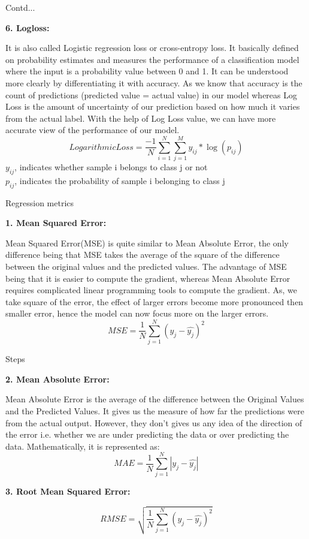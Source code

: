 \documentclass{beamer}
\newcommand\myheading[1]{%
  \par\bigskip
  {\large\bfseries#1}\par\smallskip}
\begin{document}
\begin{frame}{Contd...}
	\begin{flushleft}
	\myheading{6. Logloss:}
	It is also called Logistic regression loss or cross-entropy loss. It basically defined on probability estimates and measures the performance of a classification model where the input is a probability value between 0 and 1. It can be understood more clearly by differentiating it with accuracy. As we know that accuracy is the count of predictions (predicted value = actual value) in our model whereas Log Loss is the amount of uncertainty of our prediction based on how much it varies from the actual label. With the help of Log Loss value, we can have more accurate view of the performance of our model.
	\begin{equation*}
		Logarithmic Loss = \frac{-1}{N}\sum_{i=1}^{N}\sum_{j=1}^{M}y_{ij}*\log(p_{ij})
	\end{equation*}
	$y_{ij}$, indicates whether sample i belongs to class j or not\\
	$p_{ij}$, indicates the probability of sample i belonging to class j
	\end{flushleft}
\end{frame}

\begin{frame}{Regression metrics}
\begin{flushleft}
	\myheading{1. Mean Squared Error:}
	Mean Squared Error(MSE) is quite similar to Mean Absolute Error, the only difference being that MSE takes the average of the square of the difference between the original values and the predicted values. The advantage of MSE being that it is easier to compute the gradient, whereas Mean Absolute Error requires complicated linear programming tools to compute the gradient. As, we take square of the error, the effect of larger errors become more pronounced then smaller error, hence the model can now focus more on the larger errors.
	\begin{equation*}
		MSE = \frac{1}{N}\sum_{j=1}^{N}(y_j - \hat{y_j})^2
	\end{equation*}
\end{flushleft}
\end{frame}

\begin{frame}{Steps}
	\begin{flushleft}
		\myheading{2. Mean Absolute Error:}
		Mean Absolute Error is the average of the difference between the Original Values and the Predicted Values. It gives us the measure of how far the predictions were from the actual output. However, they don’t gives us any idea of the direction of the error i.e. whether we are under predicting the data or over predicting the data. Mathematically, it is represented as:
	\begin{equation*}
		MAE = \frac{1}{N}\sum_{j=1}^{N}|y_j - \hat{y_j}|
	\end{equation*}
	\myheading{3. Root Mean Squared Error:}
	\begin{equation*}
		RMSE = \sqrt{\frac{1}{N}\sum_{j=1}^{N}(y_j - \hat{y_j})^2}
	\end{equation*}
	\end{flushleft}
\end{frame}
\end{document}
